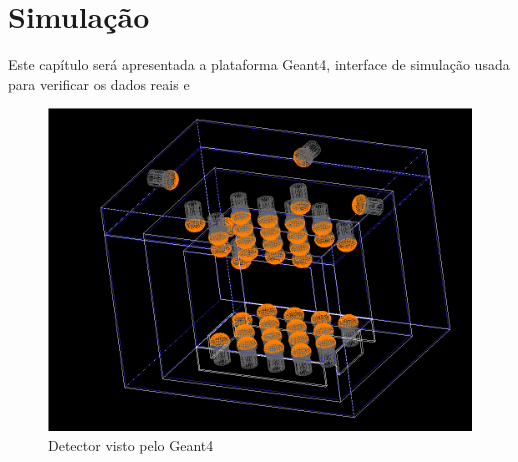 \chapter{Simulação} \label{cap:simulacao}
\vspace{-2cm}

Este capítulo será apresentada a plataforma Geant4, interface de simulação usada para verificar os dados reais e 

\begin{figure}
    \centering
    \includegraphics[width=16cm]{textuais/simulacao/figuras/sim_det.png}
    \caption{Detector visto pelo Geant4}
    \label{fig:simdetector}
\end{figure}